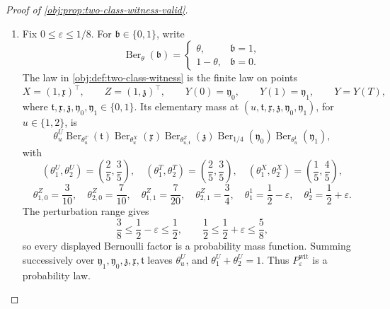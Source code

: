 \documentclass[11pt]{article}
\begin{document}
\begin{proof}[Proof of \cref{obj:prop:two-class-witness-valid}]
\begin{enumerate}
\item Fix \(0\le \varepsilon\le 1/8\).  For \(\mathfrak b\in\{0,1\}\), write
\[
\operatorname{Ber}_{\theta}(\mathfrak b)
=
\begin{cases}
\theta,& \mathfrak b=1,\\
1-\theta,& \mathfrak b=0.
\end{cases}
\]
The law in \cref{obj:def:two-class-witness} is the finite law on points
\[
X=(1,\mathfrak x)^\top,\qquad
Z=(1,\mathfrak z)^\top,\qquad
Y(0)=\mathfrak y_0,\qquad
Y(1)=\mathfrak y_1,\qquad
Y=Y(T),
\]
where \(\mathfrak t,\mathfrak x,\mathfrak z,\mathfrak y_0,\mathfrak y_1\in\{0,1\}\).  Its elementary mass at
\((u,\mathfrak t,\mathfrak x,\mathfrak z,\mathfrak y_0,\mathfrak y_1)\), for \(u\in\{1,2\}\), is
\[
\theta^U_u
\operatorname{Ber}_{\theta^T_u}(\mathfrak t)
\operatorname{Ber}_{\theta^X_u}(\mathfrak x)
\operatorname{Ber}_{\theta^Z_{u,\mathfrak t}}(\mathfrak z)
\operatorname{Ber}_{1/4}(\mathfrak y_0)
\operatorname{Ber}_{\theta^1_u}(\mathfrak y_1),
\]
with
\[
(\theta^U_1,\theta^U_2)=\left(\frac25,\frac35\right),\quad
(\theta^T_1,\theta^T_2)=\left(\frac25,\frac35\right),\quad
(\theta^X_1,\theta^X_2)=\left(\frac15,\frac45\right),
\]
\[
\theta^Z_{1,0}=\frac3{10},\quad
\theta^Z_{2,0}=\frac7{10},\quad
\theta^Z_{1,1}=\frac7{20},\quad
\theta^Z_{2,1}=\frac34,\quad
\theta^1_1=\frac12-\varepsilon,\quad
\theta^1_2=\frac12+\varepsilon .
\]
The perturbation range gives
\[
\frac38\le \frac12-\varepsilon\le \frac12,
\qquad
\frac12\le \frac12+\varepsilon\le \frac58,
\]
so every displayed Bernoulli factor is a probability mass function.  Summing successively over
\(\mathfrak y_1,\mathfrak y_0,\mathfrak z,\mathfrak x,\mathfrak t\) leaves \(\theta^U_u\), and
\(\theta^U_1+\theta^U_2=1\).  Thus \(P_{\varepsilon}^{\mathrm{wit}}\) is a probability law. %


\end{enumerate}
\end{proof}
\end{document}
